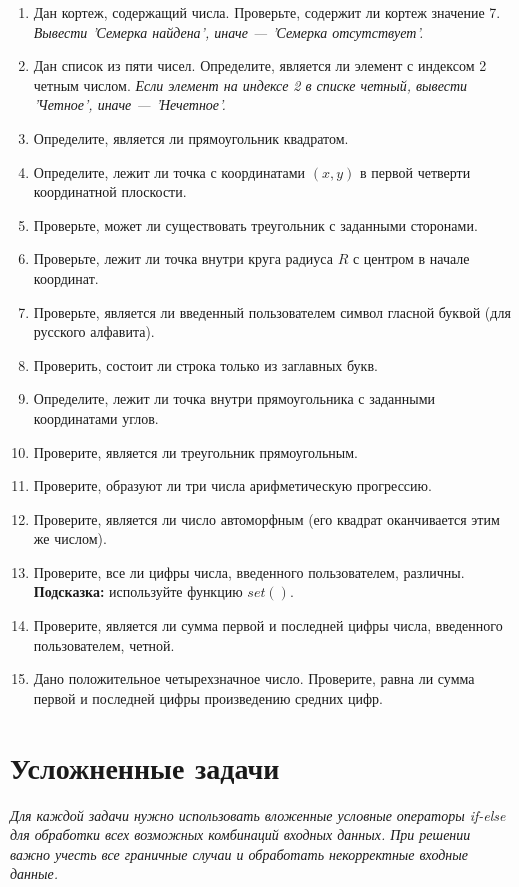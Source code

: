 \documentclass[a4,12pt]{article}
\theoremstyle{remark}
\begin{document}
\begin{enumerate}
    \item Дан кортеж, содержащий числа. Проверьте, содержит ли кортеж значение 7. \textit{Вывести 'Семерка найдена', иначе — 'Семерка отсутствует'.}
    \item Дан список из пяти чисел. Определите, является ли элемент с индексом 2 четным числом. \textit{Если элемент на индексе 2 в списке четный, вывести 'Четное', иначе — 'Нечетное'.}
    \item Определите, является ли прямоугольник квадратом.
    \item Определите, лежит ли точка с координатами $(x, y)$ в первой четверти координатной плоскости.
    \item Проверьте, может ли существовать треугольник с заданными сторонами.
    \item Проверьте, лежит ли точка внутри круга радиуса $R$ с центром в начале координат.
    \item Проверьте, является ли введенный пользователем символ гласной буквой (для русского алфавита).
    \item Проверить, состоит ли строка только из заглавных букв.
    \item Определите, лежит ли точка внутри прямоугольника с заданными координатами углов.
    \item Проверите, является ли треугольник прямоугольным.
    \item Проверите, образуют ли три числа арифметическую прогрессию.
    \item Проверите, является ли число автоморфным (его квадрат оканчивается этим же числом).
    \item Проверите, все ли цифры числа, введенного пользователем, различны. \\ \textbf{Подсказка:} используйте функцию $set()$.
    \item Проверите, является ли сумма первой и последней цифры числа, введенного пользователем, четной.
    \item Дано положительное четырехзначное число. Проверите, равна ли сумма первой и последней цифры произведению средних цифр.
\end{enumerate}

\section*{\centering Усложненные задачи}
    \textit{Для каждой задачи нужно использовать вложенные условные операторы if-else для обработки всех возможных комбинаций входных данных. При решении важно учесть все граничные случаи и обработать некорректные входные данные.}
\end{document}

